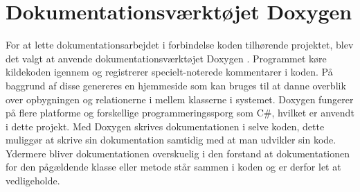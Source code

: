 \section{Dokumentationsværktøjet Doxygen}
For at lette dokumentationsarbejdet i forbindelse koden tilhørende projektet, blev det valgt at anvende dokumentationsværktøjet Doxygen \citep{doxygenWeb}. Programmet køre kildekoden igennem og registrerer specielt-noterede kommentarer i koden. På baggrund af disse genereres en hjemmeside som kan bruges til at danne overblik over opbygningen og relationerne i mellem klasserne i systemet. Doxygen fungerer på flere platforme og forskellige programmeringssporg som C\#, hvilket er anvendt i dette projekt. Med Doxygen skrives dokumentationen  i selve koden, dette muliggør at skrive sin dokumentation samtidig med at man udvikler sin kode. Ydermere bliver dokumentationen overskuelig i den forstand at dokumentationen for den pågældende klasse eller metode står sammen i koden og er derfor let at vedligeholde.